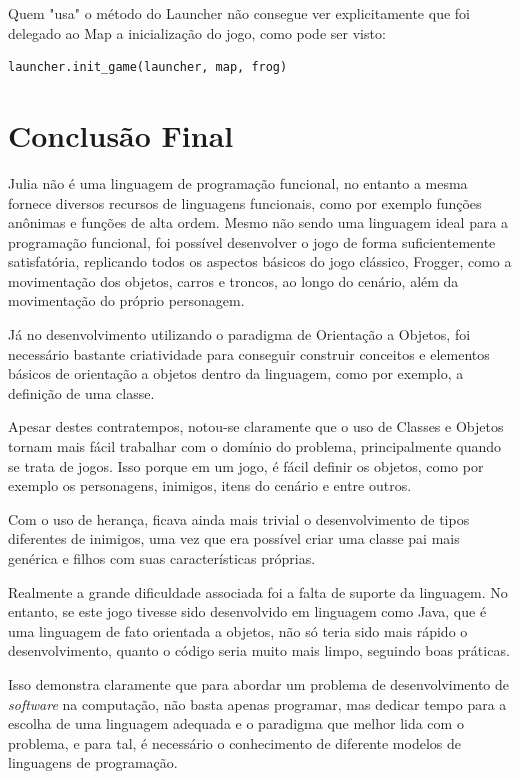 \documentclass[rel_mlp]{iiufrgs}
\begin{document}
Quem "usa" o método do Launcher não consegue ver explicitamente que foi delegado ao Map a inicialização do jogo, como pode ser visto:
\begin{lstlisting}[frame=single]
launcher.init_game(launcher, map, frog)
\end{lstlisting}
    
\chapter{Conclusão Final}
    
    Julia não é uma linguagem de programação funcional, no entanto a mesma fornece diversos recursos de linguagens funcionais, como por exemplo funções anônimas e funções de alta ordem. 
    Mesmo não sendo uma linguagem ideal para a programação funcional, foi possível desenvolver o jogo de forma suficientemente satisfatória, replicando todos os aspectos básicos do jogo clássico, Frogger, como a movimentação dos objetos, carros e troncos, ao longo do cenário, além da movimentação do próprio personagem.
    
    Já no desenvolvimento utilizando o paradigma de Orientação a Objetos, foi necessário bastante criatividade para conseguir construir conceitos e elementos básicos de orientação a objetos dentro da linguagem, como por exemplo, a definição de uma classe.
    
    Apesar destes contratempos, notou-se claramente que o uso de Classes e Objetos tornam mais fácil trabalhar com o domínio do problema, principalmente quando se trata de jogos. Isso porque em um jogo, é fácil definir os objetos, como por exemplo os personagens, inimigos, itens do cenário e entre outros. 
    
    Com o uso de herança, ficava ainda mais trivial o desenvolvimento de tipos diferentes de inimigos, uma vez que era possível criar uma classe pai mais genérica e filhos com suas características próprias.
    
    Realmente a grande dificuldade associada foi a falta de suporte da linguagem. No entanto, se este jogo tivesse sido desenvolvido em linguagem como Java, que é uma linguagem de fato orientada a objetos, não só teria sido mais rápido o desenvolvimento, quanto o código seria muito mais limpo, seguindo boas práticas.
    
    Isso demonstra claramente que para abordar um problema de desenvolvimento de \textit{software} na computação, não basta apenas programar, mas dedicar tempo para a escolha de uma linguagem adequada e o paradigma que melhor lida com o problema, e para tal, é necessário o conhecimento de diferente modelos de linguagens de programação.
\end{document}

